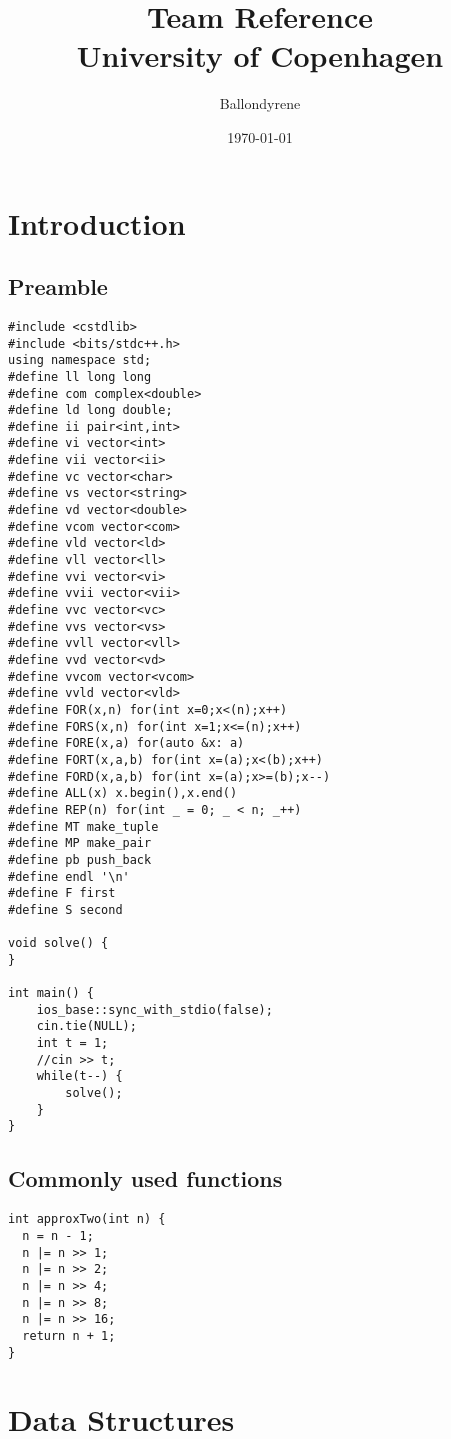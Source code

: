 \documentclass[a4paper,11pt]{article}
\title{Team Reference\\
       University of Copenhagen}
\author{Ballondyrene}
\date{\today}
\begin{document}
\maketitle
\thispagestyle{fancy}
\tableofcontents

\section{Introduction}
  \subsection{Preamble}
\begin{lstlisting}
#include <cstdlib>
#include <bits/stdc++.h>
using namespace std;
#define ll long long
#define com complex<double>
#define ld long double;
#define ii pair<int,int>
#define vi vector<int>
#define vii vector<ii>
#define vc vector<char>
#define vs vector<string>
#define vd vector<double>
#define vcom vector<com>
#define vld vector<ld>
#define vll vector<ll>
#define vvi vector<vi>
#define vvii vector<vii>
#define vvc vector<vc>
#define vvs vector<vs>
#define vvll vector<vll>
#define vvd vector<vd>
#define vvcom vector<vcom>
#define vvld vector<vld>
#define FOR(x,n) for(int x=0;x<(n);x++)
#define FORS(x,n) for(int x=1;x<=(n);x++)
#define FORE(x,a) for(auto &x: a)
#define FORT(x,a,b) for(int x=(a);x<(b);x++)
#define FORD(x,a,b) for(int x=(a);x>=(b);x--)
#define ALL(x) x.begin(),x.end()
#define REP(n) for(int _ = 0; _ < n; _++)
#define MT make_tuple
#define MP make_pair
#define pb push_back
#define endl '\n'
#define F first
#define S second

void solve() {
}

int main() {
    ios_base::sync_with_stdio(false);
    cin.tie(NULL);
    int t = 1;
    //cin >> t;
    while(t--) {
        solve();
    }
}
\end{lstlisting}
  
  \subsection{Commonly used functions}
\begin{lstlisting}
int approxTwo(int n) {
  n = n - 1;
  n |= n >> 1;
  n |= n >> 2;
  n |= n >> 4;
  n |= n >> 8;
  n |= n >> 16;
  return n + 1;
}
\end{lstlisting}

\section{Data Structures}
\end{document}
